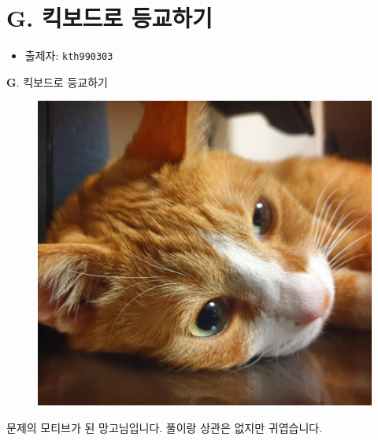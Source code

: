 \section{G. 킥보드로 등교하기}

\begin{frame} %
    \begin{itemize}
        \item 출제자: \texttt{kth990303}
    \end{itemize}
\end{frame}

\begin{frame}{\textbf{G}. 킥보드로 등교하기}
    \begin{figure}[h!]
        \centering
        \includegraphics[width=0.35\linewidth]{../images/mango/mango_sleepy.png}
    \end{figure}
    
    문제의 모티브가 된 망고님입니다. 풀이랑 상관은 없지만 귀엽습니다.
\end{frame}